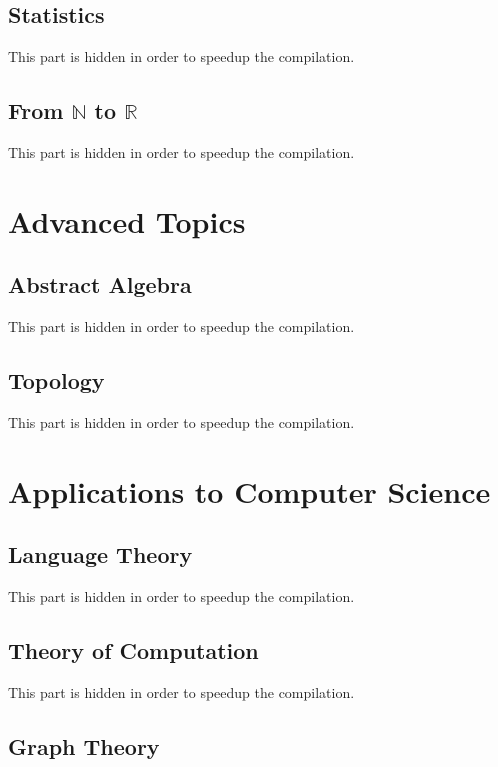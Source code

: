 \documentclass{report}
\theoremstyle{break}
\begin{document}
		\chapter{Statistics}
		    This part is hidden in order to speedup the compilation.
			
		\chapter{From $\mathbb{N}$ to $\mathbb{R}$}
		    This part is hidden in order to speedup the compilation.
	
	\part{Advanced Topics}
	    
	    \chapter{Abstract Algebra}
	        This part is hidden in order to speedup the compilation.
	    
	    \chapter{Topology}
	        This part is hidden in order to speedup the compilation.

	\part{Applications to Computer Science}
	
		\chapter{Language Theory}
		    This part is hidden in order to speedup the compilation.
		
		\chapter{Theory of Computation}
		    This part is hidden in order to speedup the compilation.
		
		\chapter{Graph Theory}
			
		
\end{document}
